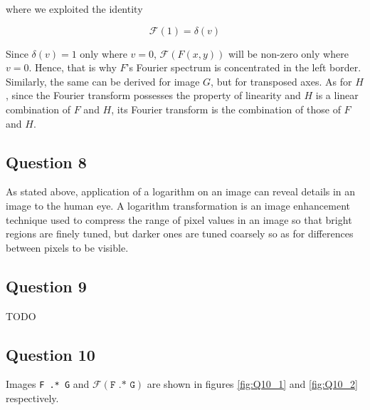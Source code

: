 where we exploited the identity

\begin{equation}
	\mathcal{F}(1) = \delta(v)
\end{equation}

Since $\delta(v) = 1$ only where $v=0$, $\mathcal{F}(F(x,y))$ will be non-zero only where $v=0$. Hence, that is why $F$'s Fourier spectrum is concentrated
in the left border. Similarly, the same can be derived for image $G$, but for transposed axes. As for $H$, since the Fourier transform possesses the property of
linearity and $H$ is a linear combination of $F$ and $H$, its Fourier transform is the combination of those of $F$ and $H$.


\subsection{Question 8}

As stated above, application of a logarithm on an image can reveal details in an image to the human eye. A logarithm transformation is an image
enhancement technique used to compress the range of pixel values in an image so that bright regions are finely tuned, but darker ones are tuned coarsely so 
as for differences between pixels to be visible.


\subsection{Question 9}
TODO

\subsection{Question 10}

Images \texttt{F .* G} and $\mathcal{F}(\texttt{F .* G})$ are shown in figures \ref{fig:Q10_1} and \ref{fig:Q10_2} respectively.

